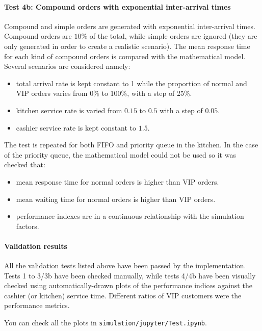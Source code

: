 \paragraph{Test 4b: Compound orders with exponential inter-arrival times}
Compound and simple orders are generated with exponential inter-arrival times.
Compound orders are $10\%$ of the total, while simple orders are ignored (they are
only generated in order to create a realistic scenario). The 
mean response time for each kind of compound orders is compared with the mathematical 
model. Several scenarios are considered namely:
\begin{itemize}
    \item total arrival rate is kept constant to 1 while the proportion of 
        normal and VIP orders varies from 0\% to 100\%, with a step of 25\%.
    \item kitchen service rate is varied from $0.15$ to $0.5$ with a step of $0.05$.
    \item cashier service rate is kept constant to $1.5$.
\end{itemize}
The test is repeated for both FIFO and priority queue in the kitchen. In the case 
of the priority queue, the mathematical model could not be used so it was checked 
that:
\begin{itemize}
    \item mean response time for normal orders is higher than VIP orders.
    \item mean waiting time for normal orders is higher than VIP orders.
    \item performance indexes are in a continuous relationship with the simulation
        factors.
\end{itemize}

\paragraph{Validation results}
All the validation tests listed above have been passed by the implementation.
Tests 1 to 3/3b have been checked manually, while tests 4/4b have been visually 
checked using automatically-drawn plots of the performance indices against the
cashier (or kitchen) service time. Different ratios of VIP customers were 
the performance metrics. 

You can check all the plots in \texttt{simulation/jupyter/Test.ipynb}.


